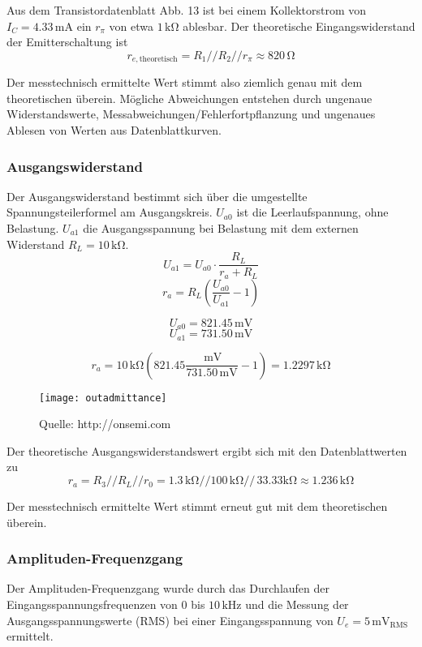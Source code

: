 Aus dem Transistordatenblatt Abb. 13 ist bei einem Kollektorstrom von $I_C = 4.33 \,
\si{\milli\ampere}$ ein $r_\pi$ von etwa $1 \, \si{\kilo\ohm}$ ablesbar. Der
theoretische Eingangswiderstand der Emitterschaltung ist
\[r_{e,\mathrm{theoretisch}} = R_1 // R_2 // r_\pi \approx 820 \,\si{\ohm}\]

Der messtechnisch ermittelte Wert stimmt also ziemlich genau mit dem
theoretischen überein. Mögliche Abweichungen entstehen durch ungenaue
Widerstandswerte, Messabweichungen/Fehlerfortpflanzung und ungenaues Ablesen von
Werten aus Datenblattkurven.

\subsubsection{Ausgangswiderstand}
Der Ausgangswiderstand bestimmt sich über die umgestellte Spannungsteilerformel
am Ausgangskreis. $U_{a0}$ ist die Leerlaufspannung, ohne Belastung. $U_{a1}$
die Ausgangsspannung bei Belastung mit dem externen Widerstand $R_L = 10 \, \si{\kilo\ohm}$.
\[U_{a1} = U_{a0} \cdot \frac{R_L}{r_a + R_L}\]
\[r_a = R_L \left( \frac{U_{a0}}{U_{a1}} -1 \right)\]

\[U_{a0} = 821.45 \, \si{\milli\volt}\]
\[U_{a1} = 731.50 \, \si{\milli\volt}\]

\[r_a = 10 \, \si{\kilo\ohm} \left( 821.45 \frac{ \, \si{\milli\volt}}{731.50 \,
      \si{\milli\volt}} -1 \right) = 1.2297 \, \si{\kilo\ohm}\]

\begin{figure}[H]
  \begin{center}
    \texttt{[image: outadmittance]}
  \end{center}
  \caption{Quelle: http://onsemi.com}
\end{figure}

Der theoretische Ausgangswiderstandswert ergibt sich mit den Datenblattwerten zu
\[r_a = R_3 // R_L // r_0 = 1.3 \, \si{\kilo\ohm} // 100 \, \si{\kilo\ohm}// \, 33.33 \si{\kilo\ohm} \approx 1.236 \, \si{\kilo\ohm}\]

Der messtechnisch ermittelte Wert stimmt erneut gut mit dem theoretischen überein.

\subsubsection{Amplituden-Frequenzgang}
Der Amplituden-Frequenzgang wurde durch das Durchlaufen der
Eingangsspannungsfrequenzen von $0$ bis $10 \, \si{\kilo\hertz}$ und die Messung
der Ausgangsspannungswerte (RMS) bei einer Eingangsspannung von $U_e =
5\,\si{\milli\volt}_{\mathrm{RMS}}$ ermittelt.


